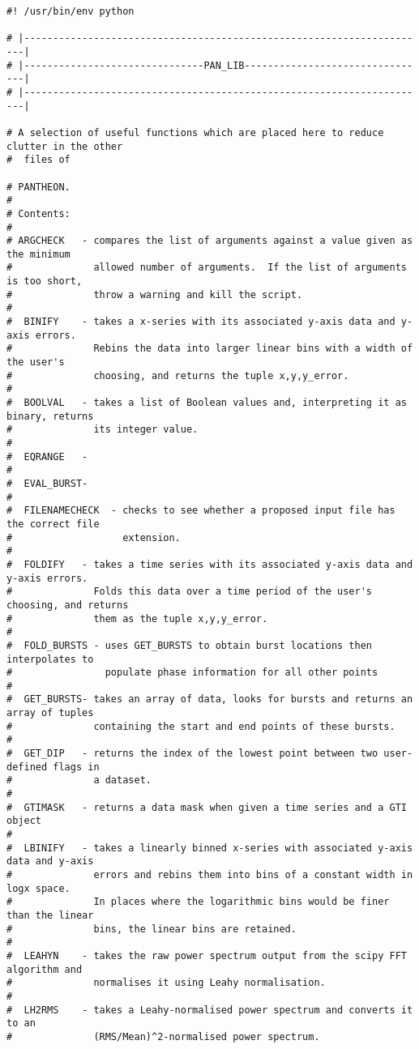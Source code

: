 \begin{verbatim}
#! /usr/bin/env python

# |----------------------------------------------------------------------|
# |-------------------------------PAN_LIB--------------------------------|
# |----------------------------------------------------------------------|

# A selection of useful functions which are placed here to reduce clutter in the other
#  files of

# PANTHEON.
#
# Contents:
#
# ARGCHECK   - compares the list of arguments against a value given as the minimum
#              allowed number of arguments.  If the list of arguments is too short,
#              throw a warning and kill the script.
#
#  BINIFY    - takes a x-series with its associated y-axis data and y-axis errors.
#              Rebins the data into larger linear bins with a width of the user's
#              choosing, and returns the tuple x,y,y_error.
#
#  BOOLVAL   - takes a list of Boolean values and, interpreting it as binary, returns 
#              its integer value.
#
#  EQRANGE   -
#
#  EVAL_BURST-
#
#  FILENAMECHECK  - checks to see whether a proposed input file has the correct file
#                   extension.
#
#  FOLDIFY   - takes a time series with its associated y-axis data and y-axis errors. 
#              Folds this data over a time period of the user's choosing, and returns
#              them as the tuple x,y,y_error.
#
#  FOLD_BURSTS - uses GET_BURSTS to obtain burst locations then interpolates to
#                populate phase information for all other points
#
#  GET_BURSTS- takes an array of data, looks for bursts and returns an array of tuples
#              containing the start and end points of these bursts.
#
#  GET_DIP   - returns the index of the lowest point between two user-defined flags in
#              a dataset.
#
#  GTIMASK   - returns a data mask when given a time series and a GTI object
#
#  LBINIFY   - takes a linearly binned x-series with associated y-axis data and y-axis
#              errors and rebins them into bins of a constant width in logx space.
#              In places where the logarithmic bins would be finer than the linear
#              bins, the linear bins are retained.
#
#  LEAHYN    - takes the raw power spectrum output from the scipy FFT algorithm and
#              normalises it using Leahy normalisation.
#
#  LH2RMS    - takes a Leahy-normalised power spectrum and converts it to an
#              (RMS/Mean)^2-normalised power spectrum.

\end{verbatim}
